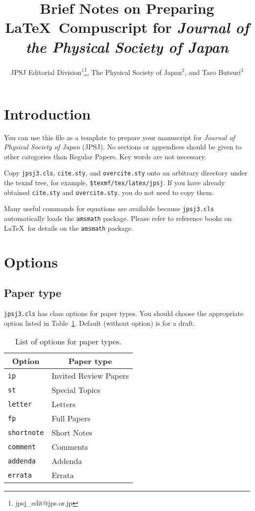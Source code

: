 \documentclass{jpsj3}
\title{Brief Notes on Preparing \LaTeX\ Compuscript for \textit{Journal of the Physical Society of Japan}}
\author{JPSJ Editorial Division$^1$\thanks{jpsj{\_}edit@jps.or.jp}, The Physical Society of Japan$^2$, and Taro Butsuri$^3$}
\begin{document}
\maketitle

\section{Introduction}

You can use this file as a template to prepare your manuscript for \textit{Journal of Physical Society of Japan} (JPSJ)\cite{jpsj,instructions}. No sections or appendices should be given to other categories than Regular Papers. Key words are not necessary.

Copy \verb|jpsj3.cls|, \verb|cite.sty|, and \verb|overcite.sty| onto an arbitrary directory under the texmf tree, for example, \verb|$texmf/tex/latex/jpsj|. If you have already obtained \verb|cite.sty| and \verb|overcite.sty|, you do not need to copy them.

Many useful commands for equations are available because \verb|jpsj3.cls| automatically loads the \verb|amsmath| package. Please refer to reference books on \LaTeX\ for details on the \verb|amsmath| package.

\section{Options}

\subsection{Paper type}

\verb|jpsj3.cls| has class options for paper types.  You should choose the appropriate option listed in Table~\ref{t1}.  Default (without option) is for a draft.

\begin{table}
\caption{List of options for paper types.}
\label{t1}
\begin{center}
\begin{tabular}{ll}
\hline
\multicolumn{1}{c}{Option} & \multicolumn{1}{c}{Paper type} \\
\hline
\verb|ip| & Invited Review Papers \\
\verb|st| & Special Topics \\
\verb|letter| & Letters \\
\verb|fp| & Full Papers \\
\verb|shortnote| & Short Notes \\
\verb|comment| & Comments \\
\verb|addenda| & Addenda \\
\verb|errata| & Errata \\
\hline
\end{tabular}
\end{center}
\end{table}
\end{document}
